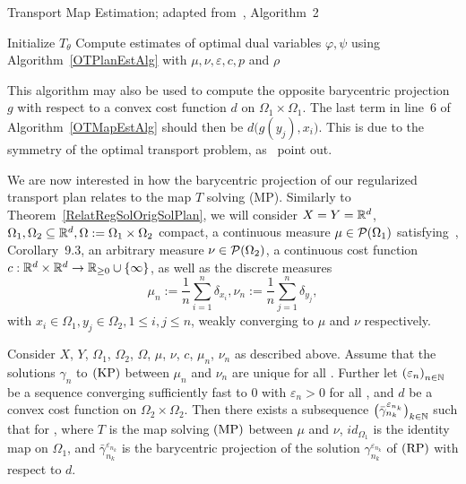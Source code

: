 \begin{algorithm}\label{OTMapEstAlg}
	\caption{Transport Map Estimation; adapted from~\cite{Seg2018}, Algorithm~2}
	Initialize $T_\theta$\;
	Compute estimates of optimal dual variables $\varphi, \psi$ using Algorithm~\ref{OTPlanEstAlg} with $\mu, \nu, \varepsilon, c, p$ and $\rho$\;
\end{algorithm}

This algorithm may also be used to compute the opposite barycentric projection $g$ with respect to a convex cost function $d$ on $\Omega_1 \times \Omega_1$. The last term in line~6 of Algorithm~\ref{OTMapEstAlg} should then be $d\big( g(y_j), x_i \big)$. This is due to the symmetry of the optimal transport problem, as~\cite{Seg2018} point out.

We are now interested in how the barycentric projection of our regularized transport plan relates to the map $T$ solving (MP). Similarly to Theorem~\ref{RelatRegSolOrigSolPlan}, we will consider $X = Y = \R^d$, $\Omega_1, \Omega_2 \subseteq \R^d, \Omega := \Omega_1 \times \Omega_2$ compact, a continuous measure $\mu \in \PM{\Omega_1}$ satisfying~\cite{Vill2009}, Corollary~9.3, an arbitrary measure $\nu \in \PM{\Omega_2}$, a continuous cost function $\map[c]{\R^d \times \R^d}{\RZero \cup \{ \infty \}}$, as well as the discrete measures
\[ \mu_n := \frac{1}{n} \sum\limits_{i = 1}^n \delta_{x_i}, \nu_n := \frac{1}{n} \sum\limits_{j = 1}^n \delta_{y_j}, \]
with $x_i \in \Omega_1, y_j \in \Omega_2, 1 \le i, j \le n$, weakly converging to $\mu$ and $\nu$ respectively.

\begin{theorem}\label{RelatRegSolOrigSolMap}
	Consider $X$, $Y$, $\Omega_1$, $\Omega_2$, $\Omega$, $\mu$, $\nu$, $c$, $\mu_n$, $\nu_n$ as described above. Assume that the solutions $\gamma_n$ to$\text{\normalfont\ (KP)}$ between $\mu_n$ and $\nu_n$ are unique for all \NinN. Further let ${(\varepsilon_n)}_{\NinN}$ be a sequence converging sufficiently fast to $0$ with $\varepsilon_n > 0$ for all \NinN, and $d$ be a convex cost function on $\Omega_2 \times \Omega_2$. Then there exists a subsequence ${\big(\bar{\gamma}^{\varepsilon_{n_k}}_{n_k}\big)}_{\NinN[k]}$ such that  for \Ninf, where $T$ is the map solving$\text{\normalfont\ (MP)}$ between $\mu$ and $\nu$, $id_{\Omega_1}$ is the identity map on $\Omega_1$, and $\bar{\gamma}^{\varepsilon_{n_k}}_{n_k}$ is the barycentric projection of the solution $\gamma^{\varepsilon_{n_k}}_{n_k}$ of$\text{\normalfont\ (RP)}$ with respect to $d$.
\end{theorem}

